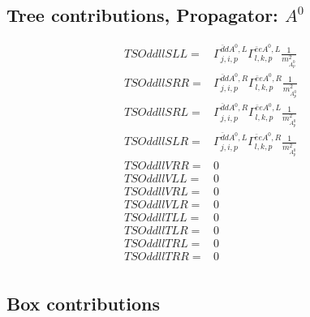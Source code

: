 \documentclass[A4,landscape]{article}
\begin{document}
\subsection{Tree contributions, Propagator: $A^0$} 

\begin{align} 
  TSOddllSLL= & \Gamma^{\bar{d}d A^0 ,L}_{j, i, p} \Gamma^{\bar{e}e A^0 ,L}_{l, k, p} \frac{1}{m^2_{A^0_{{p}}}} \\ 
  TSOddllSRR= & \Gamma^{\bar{d}d A^0 ,R}_{j, i, p} \Gamma^{\bar{e}e A^0 ,R}_{l, k, p} \frac{1}{m^2_{A^0_{{p}}}} \\ 
  TSOddllSRL= & \Gamma^{\bar{d}d A^0 ,R}_{j, i, p} \Gamma^{\bar{e}e A^0 ,L}_{l, k, p} \frac{1}{m^2_{A^0_{{p}}}} \\ 
  TSOddllSLR= & \Gamma^{\bar{d}d A^0 ,L}_{j, i, p} \Gamma^{\bar{e}e A^0 ,R}_{l, k, p} \frac{1}{m^2_{A^0_{{p}}}} \\ 
  TSOddllVRR= & 0 \\ 
  TSOddllVLL= & 0 \\ 
  TSOddllVRL= & 0 \\ 
  TSOddllVLR= & 0 \\ 
  TSOddllTLL= & 0 \\ 
  TSOddllTLR= & 0 \\ 
  TSOddllTRL= & 0 \\ 
  TSOddllTRR= & 0 \\ 
\end{align} 
\subsection{Box contributions} 
\end{document}
